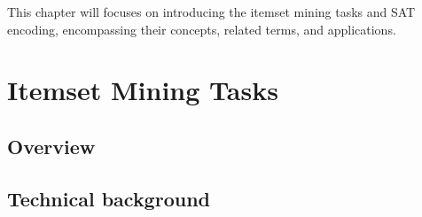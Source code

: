 This chapter will focuses on introducing the itemset mining tasks and SAT encoding, encompassing their concepts, related terms, and applications.
\section{Itemset Mining Tasks}
\subsection{Overview}
\subsection{Technical background}
